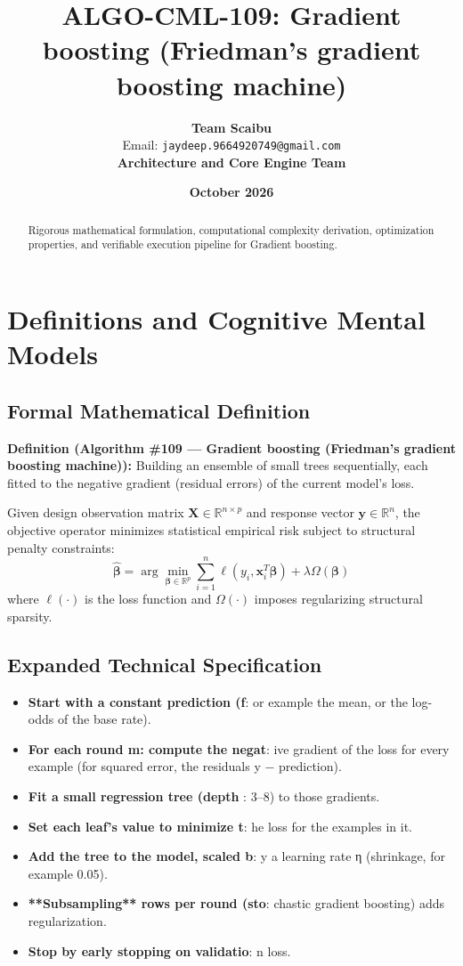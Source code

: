 \documentclass[11pt,a4paper]{article}
\title{\textbf{ALGO-CML-109: Gradient boosting (Friedman's gradient boosting machine)}}
\author{\textbf{Team Scaibu} \\ \small Email: \texttt{jaydeep.9664920749@gmail.com} \\ \small \textbf{Architecture and Core Engine Team}}
\date{\textbf{October 2026}}
\theoremstyle{definition}
\begin{document}
\maketitle

\begin{abstract}
Rigorous mathematical formulation, computational complexity derivation, optimization properties, and verifiable execution pipeline for Gradient boosting.
\end{abstract}

\section{Definitions and Cognitive Mental Models}

\subsection{Formal Mathematical Definition}
\textbf{Definition (Algorithm \#109 --- Gradient boosting (Friedman's gradient boosting machine)):}
Building an ensemble of small trees sequentially, each fitted to the negative gradient (residual errors) of the current model's loss.

Given design observation matrix $\mathbf{X} \in \mathbb{R}^{n \times p}$ and response vector $\mathbf{y} \in \mathbb{R}^n$, the objective operator minimizes statistical empirical risk subject to structural penalty constraints:
\begin{equation}
\hat{\boldsymbol{\beta}} = \arg\min_{\boldsymbol{\beta} \in \mathbb{R}^p} \sum_{i=1}^n \ell(y_i, \mathbf{x}_i^T \boldsymbol{\beta}) + \lambda \Omega(\boldsymbol{\beta})
\end{equation}
where $\ell(\cdot)$ is the loss function and $\Omega(\cdot)$ imposes regularizing structural sparsity.

\subsection{Expanded Technical Specification}
\begin{itemize}
\item \textbf{Start with a constant prediction (f}: or example the mean, or the log-odds of the base rate).
\item \textbf{For each round m: compute the negat}: ive gradient of the loss for every example (for squared error, the residuals y − prediction).
\item \textbf{Fit a small regression tree (depth }: 3–8) to those gradients.
\item \textbf{Set each leaf's value to minimize t}: he loss for the examples in it.
\item \textbf{Add the tree to the model, scaled b}: y a learning rate η (shrinkage, for example 0.05).
\item \textbf{**Subsampling** rows per round (sto}: chastic gradient boosting) adds regularization.
\item \textbf{Stop by early stopping on validatio}: n loss.
\end{itemize}
\end{document}
